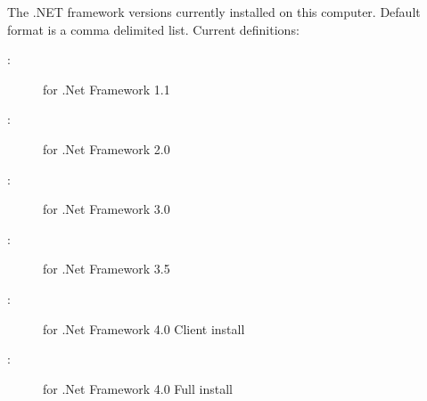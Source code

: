 \begin{description}

\item[\AdAttr{DotNetVersions}:] The .NET framework versions
  currently installed on this computer. Default format is a comma
  delimited list. Current definitions:
    \begin{description}
    \item[:] for .Net Framework 1.1
    \item[:] for .Net Framework 2.0
    \item[:] for .Net Framework 3.0
    \item[:] for .Net Framework 3.5
    \item[:] for .Net Framework 4.0 Client install
    \item[:] for .Net Framework 4.0 Full install
    \end{description}

\end{description}